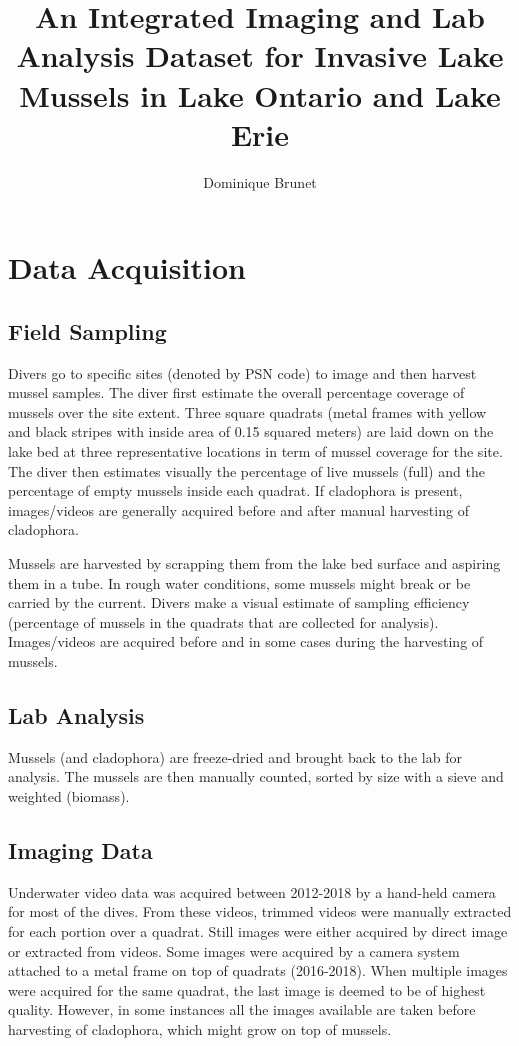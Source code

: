 \documentclass[11pt]{article} %
\title{An Integrated Imaging and Lab Analysis Dataset for Invasive Lake Mussels in Lake Ontario and Lake Erie}
\author{Dominique Brunet}
\begin{document}
\maketitle

\section{Data Acquisition}

\subsection{Field Sampling}

Divers go to specific sites (denoted by PSN code) to image and then harvest mussel samples. The diver first estimate the overall percentage coverage of mussels over the site extent. Three square quadrats (metal frames with yellow and black stripes with inside area of 0.15 squared meters) are laid down on the lake bed at three representative locations in term of mussel coverage for the site. The diver then estimates visually the percentage of live mussels (full) and the percentage of empty mussels inside each quadrat. If cladophora is present, images/videos are generally acquired before and after manual harvesting of cladophora.

Mussels are harvested by scrapping them from the lake bed surface and aspiring them in a tube. In rough water conditions, some mussels might break or be carried by the current. Divers make a visual estimate of sampling efficiency (percentage of mussels in the quadrats that are collected for analysis). Images/videos are acquired before and in some cases during the harvesting of mussels. 

\subsection{Lab Analysis}
Mussels (and cladophora) are freeze-dried and brought back to the lab for analysis. The mussels are then manually counted, sorted by size with a sieve and weighted (biomass). 

\subsection{Imaging Data}
Underwater video data was acquired between 2012-2018 by a hand-held camera for most of the dives. From these videos, trimmed videos were manually extracted for each portion over a quadrat. Still images were either acquired by direct image or extracted from videos. Some images were acquired by a camera system attached to a metal frame on top of quadrats (2016-2018). When multiple images were acquired for the same quadrat, the last image is deemed to be of highest quality. However, in some instances all the images available are taken before harvesting of cladophora, which might grow on top of mussels.
\end{document}
